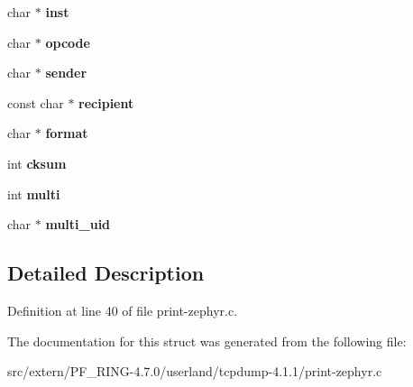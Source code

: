 \begin{DoxyCompactItemize}
\item 
\hypertarget{structz__packet_ae22361ca44c6cdf3e8e722fcf76fa809}{
char $\ast$ {\bfseries inst}}
\label{structz__packet_ae22361ca44c6cdf3e8e722fcf76fa809}

\item 
\hypertarget{structz__packet_ae760e17eea560a5351d0e299072434e3}{
char $\ast$ {\bfseries opcode}}
\label{structz__packet_ae760e17eea560a5351d0e299072434e3}

\item 
\hypertarget{structz__packet_ac066ec185eadae8a89cfb82b1e782219}{
char $\ast$ {\bfseries sender}}
\label{structz__packet_ac066ec185eadae8a89cfb82b1e782219}

\item 
\hypertarget{structz__packet_a80fb55e362afb1d41adfd35039f5f18d}{
const char $\ast$ {\bfseries recipient}}
\label{structz__packet_a80fb55e362afb1d41adfd35039f5f18d}

\item 
\hypertarget{structz__packet_ad959556322f46c473214add3d73563e7}{
char $\ast$ {\bfseries format}}
\label{structz__packet_ad959556322f46c473214add3d73563e7}

\item 
\hypertarget{structz__packet_a613ede1bbde743f7b2c703b43a531ddf}{
int {\bfseries cksum}}
\label{structz__packet_a613ede1bbde743f7b2c703b43a531ddf}

\item 
\hypertarget{structz__packet_a3864f7b23925f80cf809b4d33a329432}{
int {\bfseries multi}}
\label{structz__packet_a3864f7b23925f80cf809b4d33a329432}

\item 
\hypertarget{structz__packet_a4f9bc6b5572e4f681039f3e576abc7d6}{
char $\ast$ {\bfseries multi\_\-uid}}
\label{structz__packet_a4f9bc6b5572e4f681039f3e576abc7d6}

\end{DoxyCompactItemize}


\subsection{Detailed Description}


Definition at line 40 of file print-\/zephyr.c.



The documentation for this struct was generated from the following file:\begin{DoxyCompactItemize}
\item 
src/extern/PF\_\-RING-\/4.7.0/userland/tcpdump-\/4.1.1/print-\/zephyr.c\end{DoxyCompactItemize}
